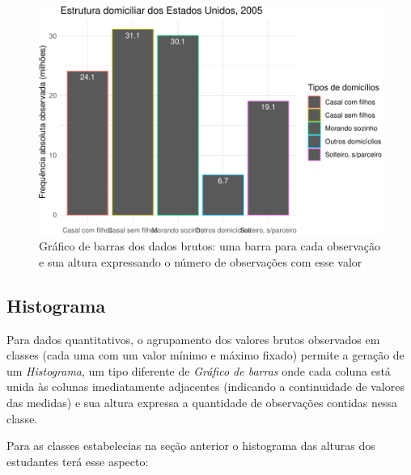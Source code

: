 \documentclass[
]{book}
\begin{document}
\begin{figure}
\centering
\includegraphics{apostila_files/figure-latex/unnamed-chunk-47-1.pdf}
\caption{\label{fig:unnamed-chunk-47}Gráfico de barras dos dados brutos: uma barra para cada observação e sua altura expressando o número de observações com esse valor}
\end{figure}

\hfill\break

\hypertarget{histograma}{%
\subsection{Histograma}\label{histograma}}

\hfill\break

Para dados quantitativos, o agrupamento dos valores brutos observados em classes (cada uma com um valor mínimo e máximo fixado) permite a geração de um \emph{Histograma}, um tipo diferente de \emph{Gráfico de barras} onde cada coluna está unida às colunas imediatamente adjacentes (indicando a continuidade de valores das medidas) e sua altura expressa a quantidade de observações contidas nessa classe.

\hfill\break

Para as classes estabelecias na seção anterior o histograma das alturas dos estudantes terá esse aspecto:

\hfill\break
\end{document}
